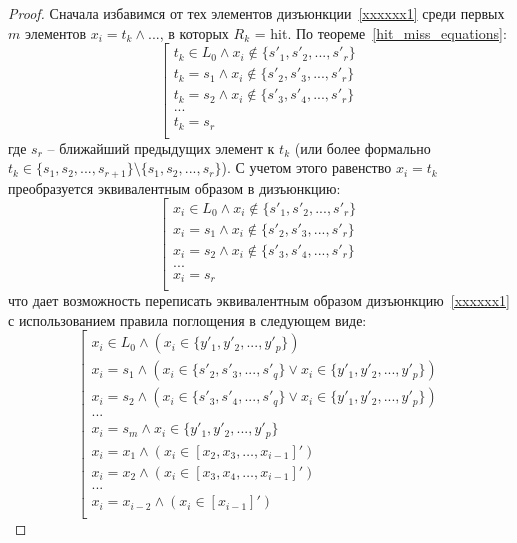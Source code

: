\begin{proof}
  Сначала избавимся от тех элементов дизъюнкции~\ref{xxxxxx1} среди первых $m$
  элементов $x_i = t_k \wedge ...$, в которых $R_k$ = hit. По
  теореме~\ref{hit_miss_equations}:
  $$\left[ \begin{array}{l}
  t_k \in L_0 \wedge x_i \notin \{s'_1, s'_2, ..., s'_r\}\\
  t_k = s_1 \wedge x_i \notin \{s'_2, s'_3, ..., s'_r\}\\
  t_k = s_2 \wedge x_i \notin \{s'_3, s'_4, ..., s'_r\}\\
  ...\\
  t_k = s_r\\
  \end{array} \right.
  $$
  где $s_r$ -- ближайший предыдущих элемент к $t_k$ (или более
  формально $t_k \in \{s_1, s_2, ..., s_{r+1}\} \setminus \{s_1, s_2, ...,
  s_r\}$). С учетом этого равенство $x_i = t_k$ преобразуется
  эквивалентным образом в дизъюнкцию:
  $$\left[ \begin{array}{l}
  x_i \in L_0 \wedge x_i \notin \{s'_1, s'_2, ..., s'_r\}\\
  x_i = s_1 \wedge x_i \notin \{s'_2, s'_3, ..., s'_r\}\\
  x_i = s_2 \wedge x_i \notin \{s'_3, s'_4, ..., s'_r\}\\
  ...\\
  x_i = s_r\\
  \end{array} \right.
  $$
  что дает возможность переписать эквивалентным образом
  дизъюнкцию~\ref{xxxxxx1} с использованием правила поглощения в следующем виде:
  \begin{equation}\label{xxxxxx2}
  \left[\begin{array}{l}
    x_i \in L_0 \wedge (x_i \in \{y'_1, y'_2, ..., y'_p\})\\
    x_i = s_1 \wedge (x_i\in\{s'_2, s'_3, ..., s'_q\} \vee x_i
    \in \{y'_1, y'_2, ..., y'_p\})\\
    x_i = s_2 \wedge (x_i\in\{s'_3, s'_4, ..., s'_q\} \vee x_i
    \in \{y'_1, y'_2, ..., y'_p\})\\
    ...\\
    x_i = s_m \wedge x_i \in \{y'_1, y'_2, ..., y'_p\}\\
    x_i = x_1 \wedge (x_i \in [x_2, x_3, \dots, x_{i-1}]')\\
    x_i = x_2 \wedge (x_i \in [x_3, x_4, \dots, x_{i-1}]')\\
    ...\\
    x_i = x_{i-2} \wedge (x_i \in [x_{i-1}]')\\
  \end{array}\right.\end{equation}


\end{proof}
